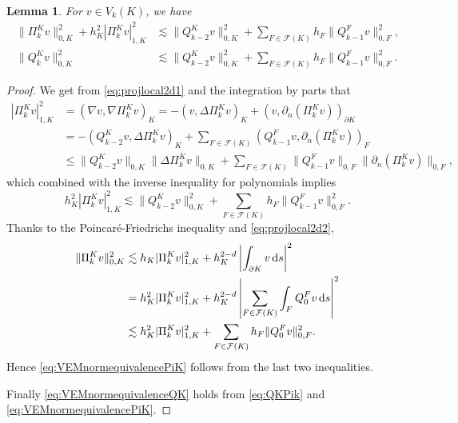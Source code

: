 \documentclass[10pt]{amsart}
\newtheorem{lemma}[theorem]{Lemma}
\numberwithin{equation}{section}
\begin{document}
\begin{lemma}
For $v\in V_k(K)$, we have
\begin{align}
\|\Pi_k^Kv\|_{0,K}^2+h_K^2|\Pi_k^Kv|_{1,K}^2&\lesssim \|Q_{k-2}^Kv\|_{0,K}^2+\sum_{F\in\mathcal F(K)}h_F\|Q_{k-1}^Fv\|_{0,F}^2, \label{eq:VEMnormequivalencePiK}\\
\|Q_k^Kv\|_{0,K}^2&\lesssim \|Q_{k-2}^Kv\|_{0,K}^2+\sum_{F\in\mathcal F(K)}h_F\|Q_{k-1}^Fv\|_{0,F}^2. \label{eq:VEMnormequivalenceQK}
\end{align}
\end{lemma}
\begin{proof}
We get from \eqref{eq:projlocal2d1} and the integration by parts that
\begin{align*}
|\Pi_k^Kv|_{1,K}^2&=(\nabla v, \nabla\Pi_k^Kv)_K=-(v, \Delta\Pi_k^Kv)_K+(v, \partial_n(\Pi_k^Kv))_{\partial K} \\
&=-(Q_{k-2}^Kv, \Delta\Pi_k^Kv)_K+\sum_{F\in\mathcal F(K)}(Q_{k-1}^Fv, \partial_n(\Pi_k^Kv))_{F} \\
&\leq\|Q_{k-2}^Kv\|_{0,K}\|\Delta\Pi_k^Kv\|_{0,K}+\sum_{F\in\mathcal F(K)}\|Q_{k-1}^Fv\|_{0,F}\|\partial_n(\Pi_k^Kv)\|_{0,F},
\end{align*}
which combined with the inverse inequality for polynomials implies
\[%
h_K^2|\Pi_k^Kv|_{1,K}^2\lesssim \|Q_{k-2}^Kv\|_{0,K}^2+\sum_{F\in\mathcal F(K)}h_F\|Q_{k-1}^Fv\|_{0,F}^2. 
\]
Thanks to the Poincar\'e-Friedrichs inequality \cite[(2.15)]{BrennerSung2018} and \eqref{eq:projlocal2d2},
\begin{align*}  
\|\Pi_k^Kv\|_{0,K}^2&\lesssim h_K|\Pi_k^Kv|_{1,K}^2+h_K^{2-d}\left|\int_{\partial K}v\,{\rm d}s\right|^2 \\
&=h_K^2|\Pi_k^Kv|_{1,K}^2+h_K^{2-d}\left|\sum_{F\in\mathcal F(K)}\int_{F}Q_{0}^Fv\,{\rm d}s\right|^2 \\
&\lesssim h_K^2|\Pi_k^Kv|_{1,K}^2+\sum_{F\in\mathcal F(K)}h_F\|Q_{0}^Fv\|_{0,F}^2.
\end{align*}
Hence \eqref{eq:VEMnormequivalencePiK} follows from the last two inequalities.

Finally \eqref{eq:VEMnormequivalenceQK} holds from \eqref{eq:QKPik} and \eqref{eq:VEMnormequivalencePiK}.
\end{proof}
\end{document}
